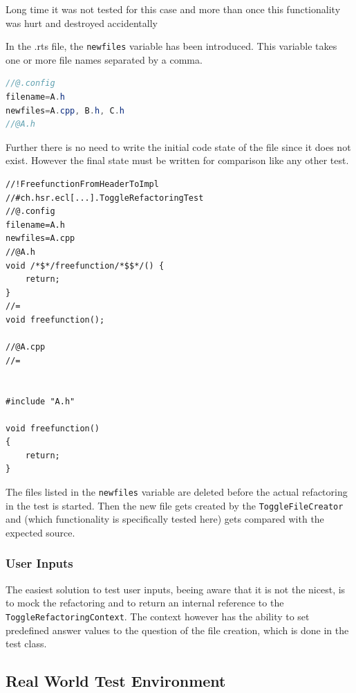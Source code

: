 Long time it was not tested for this case and more than once this functionality
was hurt and destroyed accidentally 

In the .rts file, the \texttt{newfiles} variable has been introduced. This
variable takes one or more file names separated by a comma.

\begin{lstlisting}[caption={Syntax to set variables inside a .rts file},
language=java]
//@.config
filename=A.h
newfiles=A.cpp, B.h, C.h
//@A.h
\end{lstlisting}

Further there is no need to write the initial code state of the file since it
does not exist. However the final state must be written for comparison like
any other test.

\begin{lstlisting}[caption={Writing test for newfile creation }]
//!FreefunctionFromHeaderToImpl
//#ch.hsr.ecl[...].ToggleRefactoringTest
//@.config
filename=A.h
newfiles=A.cpp
//@A.h
void /*$*/freefunction/*$$*/() {
    return;
}
//=
void freefunction();

//@A.cpp
//=


#include "A.h"

void freefunction()
{
    return;
}
\end{lstlisting}

The files listed in the \texttt{newfiles} variable are deleted before the
actual refactoring in the test is started. Then the new file gets created by
the \texttt{ToggleFileCreator} and (which functionality is specifically tested
here) gets compared with the expected source.


\subsubsection{User Inputs}

The easiest solution to test user inputs, beeing aware that it is not the
nicest, is to mock the refactoring and to return an internal reference to the
\texttt{ToggleRefactoringContext}. The context however has the ability to set
predefined answer values to the question of the file creation, which is done in
the test class.

\subsection{Real World Test Environment}

